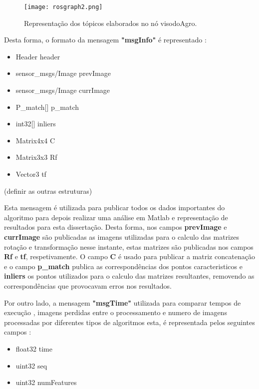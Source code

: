 	\begin{figure}[h!] %
		\begin{center}
			\leavevmode		
			\texttt{[image: rosgraph2.png]}
			\caption{Representação dos tópicos elaborados no nó visodoAgro.}
			\label{fig:rosgraph}
		\end{center}
	\end{figure}
	
	Desta forma, o formato da mensagem \textbf{"msgInfo"} é representado : 
	\begin{itemize}
		\item Header header
		
		\item sensor\_msgs/Image prevImage
		\item sensor\_msgs/Image currImage
		
		\item P\_match[] p\_match	
		\item int32[] inliers
	
		\item Matrix4x4 C
		\item Matrix3x3 Rf
		\item Vector3 tf
		
	\end{itemize}
(definir as outras estruturas)
	
	Esta mensagem é utilizada para publicar todos os dados importantes do algoritmo para depois realizar uma análise em Matlab e representação de resultados para esta dissertação. 
	Desta forma, nos campos \textbf{prevImage} e \textbf{currImage} são publicadas as imagens utilizadas para o calculo das matrizes rotação e transformação nesse instante, estas matrizes são publicadas nos campos \textbf{Rf} e \textbf{tf}, respetivamente. O campo \textbf{C} é usado para publicar a matriz concatenação e o campo \textbf{p\_match} publica as correspondências dos pontos caracteristicos e \textbf{inliers} os pontos utilizados para o calculo das matrizes resultantes, removendo as correspondências que provocavam erros nos resultados.  
	
	
	Por outro lado, a mensagem \textbf{"msgTime"} utilizada para comparar tempos de execução , imagens perdidas entre o processamento e numero de imagens processadas por diferentes tipos de algoritmos esta, é representada pelos seguintes campos :
	\begin{itemize}
		\item float32 time
		
		\item uint32 seq
		\item uint32 numFeatures
	\end{itemize}
	

